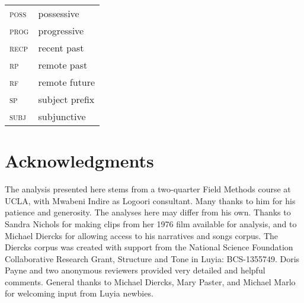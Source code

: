 \documentclass[output=paper]{langsci/langscibook}
\begin{document}
\begin{longtable}[l]{ll}
\textsc{poss}  &  possessive \\

\textsc{prog}  &  progressive \\

\textsc{recp}  &  recent past \\

\textsc{rp}  &  remote past \\

\textsc{rf}  &  remote future \\

\textsc{sp}  &  subject prefix \\

\textsc{subj}   & subjunctive \\
\end{longtable}

\section*{Acknowledgments}

The analysis presented here stems from a two-quarter Field Methods course at UCLA, with Mwabeni Indire as Logoori consultant. Many thanks to him for his patience and generosity. The analyses here may differ from his own. Thanks to Sandra Nichols for making clips from her 1976 film available for analysis, and to Michael Diercks for allowing access to his narratives and songs corpus. The Diercks corpus was created with support from the National Science Foundation Collaborative Research Grant, Structure and Tone in Luyia: BCS-1355749. Doris Payne and two anonymous reviewers provided very detailed and helpful comments. General thanks to Michael Diercks, Mary Paster, and Michael Marlo for welcoming input from Luyia newbies.

\printbibliography[heading=subbibliography,notkeyword=this]
\end{document}
